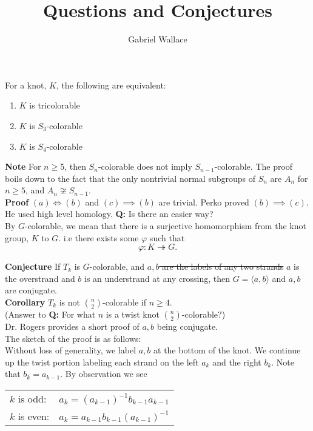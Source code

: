 \documentclass[letterpaper, 11pt]{article}
\title{Questions and Conjectures}
\author{Gabriel Wallace}
\date{}
\newcommand{\inv}{^{-1}}
\newcommand{\Pf}{\textbf{Proof} }
\newcommand{\Qu}{\textbf{Q:} }
\newcommand{\Cor}{\textbf{Corollary} }
\newcommand{\Conj}{\textbf{Conjecture} }
\newcommand{\Note}{\textbf{Note} }
\begin{document}
\maketitle

For a knot, $K$, the following are equivalent:
\begin{enumerate}[label=(\alph*)]
	\item $K$ is tricolorable
	\item $K$ is $S_3$-colorable
	\item $K$ is $S_4$-colorable
\end{enumerate}

\Note For $n \geq 5$, then $S_n$-colorable does not imply $S_{n-1}$-colorable. The proof boils down
to the fact that the only nontrivial normal subgroups of $S_n$ are $A_n$ for $n \geq 5$, and $A_n
\not\cong S_{n-1}$.\\

\Pf $(a) \iff (b)$ and $(c) \implies (b)$ are trivial. Perko proved $(b) \implies (c)$. He used high
level homology. \Qu Is there an easier way?\\

By $G$-colorable, we mean that there is a surjective homomorphism from the knot group, $K$ to $G$.
i.e there exists some $\varphi$ such that
\[\varphi: K \twoheadrightarrow G.\]

\Conj If $T_k$ is $G$-colorable, and \sout{$a,b$ are the labels of any two strands} $a$ is the
overstrand and $b$ is an understrand at any crossing, then $G = \langle a, b \rangle$ and $a, b$ are
conjugate. \\

\Cor $T_k$ is not $\binom{n}{2}$-colorable if $n \geq 4$. \\ 
(Answer to \Qu For what $n$ is a twist knot $\binom{n}{2}$-colorable?)\\

Dr. Rogers provides a short proof of $a, b$ being conjugate. \\

The sketch of the proof is as follows:\\
Without loss of generality, we label $a, b$ at the bottom of the knot. We continue up the twist
portion labeling each strand on the left $a_k$ and the right $b_k$. Note that $b_k = a_{k-1}$. By
observation we see 
\begin{center}
	\begin{tabular}{l c}
		$k$ is odd: & $a_k = (a_{k-1})\inv b_{k-1} a_{k-1}$\\
		$k$ is even: & $a_k = {a_{k-1}} b_{k-1} (a_{k-1})\inv$\\
	\end{tabular}
\end{center}
\end{document}
